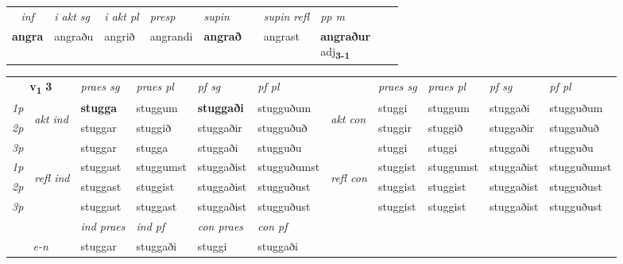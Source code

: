 \begin{tabular}{lllllllllll}
   \multicolumn{2}{c}{\textit{inf}}  & \textit{i akt sg} & \textit{i akt pl}   & \textit{presp} & \textit{supin} && \textit{supin refl} & \textit{pp m} \\*
  \multicolumn{2}{c}{\textbf{angra}} & angraðu  & angrið   & angrandi &  \textbf{angrað} && angrast & \specialcell{\textbf{angraður} \\ adj\textbf{\textsubscript{3-1}}} \\*
\end{tabular}

\noindent
\begin{tabular}{lllllllllll} \toprule
\multicolumn{2}{c}{\textbf{v{\textsubscript{1}}} \Large{\textbf{3}}}  &  \textit{praes sg}  & \textit{praes pl}  &\textit{ pf sg} & \textit{pf pl} &  &  \textit{praes sg}  & \textit{praes pl}  & \textit{pf sg} & \textit{pf pl } \\*
	\cmidrule{3-6} \cmidrule{8-11}
 {\textit{1p}} & \multirow{3}{*}{\begin{turn}{90}\textit{akt ind}\end{turn}} & \textbf{stugga} & stuggum & \textbf{stuggaði} & stugguðum & \multirow{3}{*}{\begin{turn}{90}\textit{akt con}\end{turn}} &stuggi & stuggum & stuggaði & stugguðum\\*
 {\textit{2p}} &  &  stuggar  & stuggið & stuggaðir & stugguðuð & & stuggir & stuggið & stuggaðir & stugguðuð \\*
{\textit{3p}} &  & stuggar & stugga & stuggaði & stugguðu & & stuggi & stuggi& stuggaði & stugguðu \\*
\cmidrule{3-6} \cmidrule{8-11}
 {\textit{1p}} & \multirow{3}{*}{\begin{turn}{90}\textit{refl ind}\end{turn}}  & stuggast & stuggumst & stuggaðist & stugguðumst & \multirow{3}{*}{\begin{turn}{90}\textit{refl con}\end{turn}}  &stuggist & stuggumst & stuggaðist & stugguðumst \\*
 {\textit{2p}} &  & stuggast & stuggist & stuggaðist & stugguðust & &stuggist & stuggist & stuggaðist & stugguðust \\*
 {\textit{3p}}  & & stuggast & stuggast & stuggaðist & stugguðust & & stuggist & stuggist& stuggaðist & stugguðust \\*
\cmidrule{3-6} \cmidrule{8-11}

   & &  \textit{ind praes} & \textit{ind pf} & \textit{con praes} & \textit{con pf} \\*
\multicolumn{2}{c}{ \textit{e-n} } & stuggar & stuggaði & stuggi & stuggaði \\*


\end{tabular}
